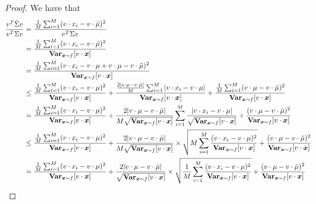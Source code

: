 \begin{proof}
We have that
\begin{align*}
\frac{v^T \tSigma v}{v^T \Sigma v}
  & = \frac{\frac{1}{M} \sum_{i=1}^{M} (v \cdot x_i - v \cdot \tmu )^2}{v^T \Sigma v} \\
  & = \frac{\frac{1}{M} \sum_{i=1}^{M} (v \cdot x_i - v \cdot \tmu )^2}{\Var_{\bx \sim f} [v \cdot \bx]} \\
  & = \frac{\frac{1}{M} \sum_{i=1}^{M} (v \cdot x_i - v \cdot \mu + v \cdot \mu - v \cdot \tmu)^2}
           {\Var_{\bx \sim f} [v \cdot \bx]} \\
  & \leq \frac{\frac{1}{M} \sum_{i=1}^{M} (v \cdot x_i - v \cdot \mu)^2}
           {\Var_{\bx \sim f} [v \cdot \bx]} 
           + \frac{\frac{2 |v \cdot \mu - v \cdot \tmu|}{M} \sum_{i=1}^{M} |v \cdot x_i - v \cdot \mu|}
           {\Var_{\bx \sim f} [v \cdot \bx]} 
           + \frac{\frac{1}{M} \sum_{i=1}^{M} (v \cdot \mu - v \cdot \tmu)^2}
           {\Var_{\bx \sim f} [v \cdot \bx]} 
                \\
  & = \frac{\frac{1}{M} \sum_{i=1}^{M} (v \cdot x_i - v \cdot \mu)^2}
           {\Var_{\bx \sim f} [v \cdot \bx]} 
           + \frac{2 |v \cdot \mu - v \cdot \tmu|}{M \sqrt{\Var_{\bx \sim f} [v \cdot \bx]}} 
              \sum_{i=1}^{M} \frac{|v \cdot x_i - v \cdot \mu|}
                                    {\sqrt{\Var_{\bx \sim f} [v \cdot \bx]}} 
           + \frac{(v \cdot \mu - v \cdot \tmu)^2}
           {\Var_{\bx \sim f} [v \cdot \bx]} 
                \\
  & \leq \frac{\frac{1}{M} \sum_{i=1}^{M} (v \cdot x_i - v \cdot \mu)^2}
           {\Var_{\bx \sim f} [v \cdot \bx]} 
           + \frac{2 |v \cdot \mu - v \cdot \tmu|}{M \sqrt{\Var_{\bx \sim f} [v \cdot \bx]}} 
              \times \sqrt{M \sum_{i=1}^{M} \frac{(v \cdot x_i - v \cdot \mu)^2}
                                    {\Var_{\bx \sim f} [v \cdot \bx]} }
           + \frac{(v \cdot \mu - v \cdot \tmu)^2}
           {\Var_{\bx \sim f} [v \cdot \bx]} 
                \\
  & = \frac{\frac{1}{M} \sum_{i=1}^{M} (v \cdot x_i - v \cdot \mu)^2}
           {\Var_{\bx \sim f} [v \cdot \bx]} 
           + \frac{2 |v \cdot \mu - v \cdot \tmu|}{\sqrt{\Var_{\bx \sim f} [v \cdot \bx]}} 
              \times \sqrt{\frac{1}{M} \sum_{i=1}^{M} \frac{(v \cdot x_i - v \cdot \mu)^2}
                                    {\Var_{\bx \sim f} [v \cdot \bx]} }
           + \frac{(v \cdot \mu - v \cdot \tmu)^2}
           {\Var_{\bx \sim f} [v \cdot \bx]} 
                \\

\end{align*}
\end{proof}
